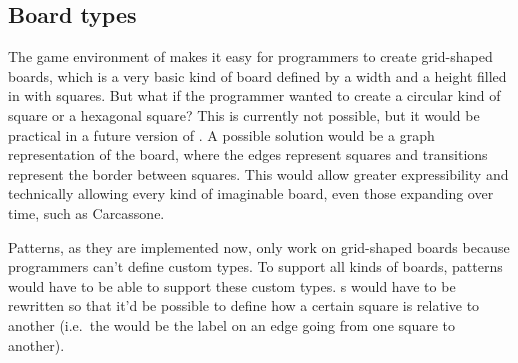 \subsection{Board types}
\label{sec:boardtypes}

The game environment of \productname{} makes it easy for programmers
to create grid-shaped boards, which is a very basic kind of board
defined by a width and a height filled in with squares. But what if the
programmer wanted to create a circular kind of square or a hexagonal
square? This is currently not possible, but it would be practical in
a future version of \productname{}. A possible solution would be a
graph representation of the board, where the edges represent squares
and transitions represent the border between squares. This would
allow greater expressibility and technically allowing every kind of
imaginable board, even those expanding over time, such as Carcassone.

Patterns, as they are implemented now, only work on grid-shaped boards
because programmers can't define custom  types. To
support all kinds of boards, patterns would have to be able to support
these custom  types. s would have to be
rewritten so that it'd be possible to define how a certain square is
relative to another (i.e.\ the  would be the label on
an edge going from one square to another).
